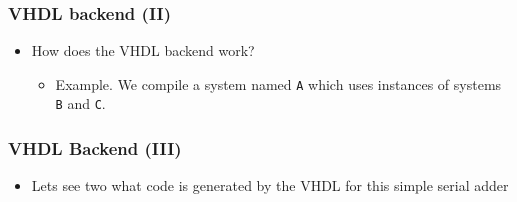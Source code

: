 \documentclass{beamer}
\begin{document}
\beamerdefaultoverlayspecification{}
\begin{frame}
  \frametitle{VHDL backend (II)}
\vspace{-0.2cm}
\begin{itemize}
\item How does the VHDL backend work?
  \begin{itemize}
  \item Example. We compile a system named \texttt{A} which uses instances 
    of systems \texttt{B} and \texttt{C}.
  \end{itemize}
\vspace{0.1cm}
\begin{center}
\end{center}
\end{itemize}
\end{frame}


\begin{frame}
  \frametitle{VHDL Backend (III)}
  \begin{itemize}
  \item Lets see two what code is generated by the VHDL for this simple
    serial adder
    \begin{center}
    \end{center}
  \end{itemize}
\end{frame}

\beamerdefaultoverlayspecification{<+->}
\end{document}

